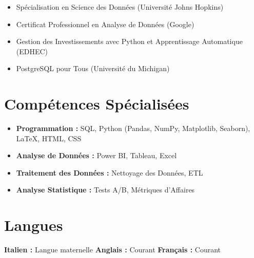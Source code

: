\documentclass[letterpaper,10.5pt]{article}
\begin{document}
\begin{multicols}{2}
    \small
    \begin{itemize}[leftmargin=0.2in, label={-}]
        \item Spécialisation en Science des Données (Université Johns Hopkins)
        \item Certificat Professionnel en Analyse de Données (Google)
    \end{itemize}
    \begin{itemize}[leftmargin=0.2in, label={-}]
        \item Gestion des Investissements avec Python et Apprentissage Automatique (EDHEC)
        \item PostgreSQL pour Tous (Université du Michigan)
    \end{itemize}
\end{multicols}

\section*{Compétences Spécialisées}
\begin{multicols}{2}
\begin{itemize}[leftmargin=0.2in]
    \item \textbf{Programmation :} SQL, Python (Pandas, NumPy, Matplotlib, Seaborn), LaTeX, HTML, CSS
    \item \textbf{Analyse de Données :} Power BI, Tableau, Excel
    \item \textbf{Traitement des Données :} Nettoyage des Données, ETL
    \item \textbf{Analyse Statistique :} Tests A/B, Métriques d'Affaires
\end{itemize}
\end{multicols}

\section*{Langues}
\textbf{Italien :} Langue maternelle \hspace{10pt} \textbf{Anglais :} Courant \hspace{10pt} \textbf{Français :} Courant
\end{document}
